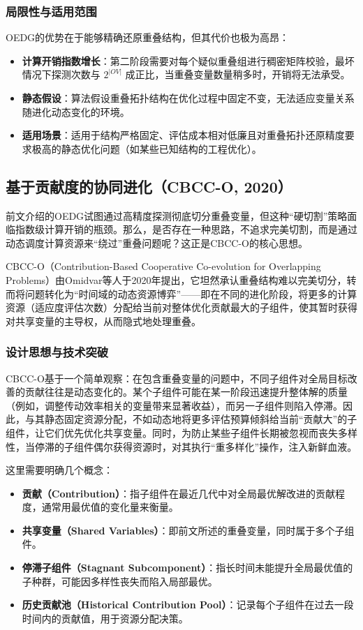 \subsubsection{局限性与适用范围}
OEDG的优势在于能够精确还原重叠结构，但其代价也极为高昂：
\begin{itemize}
    \item \textbf{计算开销指数增长}：第二阶段需要对每个疑似重叠组进行稠密矩阵校验，最坏情况下探测次数与 $2^{|OV|}$ 成正比，当重叠变量数量稍多时，开销将无法承受。
    \item \textbf{静态假设}：算法假设重叠拓扑结构在优化过程中固定不变，无法适应变量关系随进化动态变化的环境。
    \item \textbf{适用场景}：适用于结构严格固定、评估成本相对低廉且对重叠拓扑还原精度要求极高的静态优化问题（如某些已知结构的工程优化）。
\end{itemize}

\subsection{基于贡献度的协同进化（CBCC-O, 2020）}

前文介绍的OEDG试图通过高精度探测彻底切分重叠变量，但这种“硬切割”策略面临指数级计算开销的瓶颈。那么，是否存在一种思路，不追求完美切割，而是通过动态调度计算资源来“绕过”重叠问题呢？这正是CBCC-O的核心思想。

CBCC-O（Contribution-Based Cooperative Co-evolution for Overlapping Problems）由Omidvar等人于2020年提出，它坦然承认重叠结构难以完美切分，转而将问题转化为“时间域的动态资源博弈”——即在不同的进化阶段，将更多的计算资源（适应度评估次数）分配给当前对整体优化贡献最大的子组件，使其暂时获得对共享变量的主导权，从而隐式地处理重叠。

\subsubsection{设计思想与技术突破}
CBCC-O基于一个简单观察：在包含重叠变量的问题中，不同子组件对全局目标改善的贡献往往是动态变化的。某个子组件可能在某一阶段迅速提升整体解的质量（例如，调整传动效率相关的变量带来显著收益），而另一子组件则陷入停滞。因此，与其静态固定资源分配，不如动态地将更多评估预算倾斜给当前“贡献大”的子组件，让它们优先优化共享变量。同时，为防止某些子组件长期被忽视而丧失多样性，当停滞的子组件偶尔获得资源时，对其执行“重多样化”操作，注入新鲜血液。

这里需要明确几个概念：
\begin{itemize}
    \item \textbf{贡献（Contribution）}：指子组件在最近几代中对全局最优解改进的贡献程度，通常用最优值的变化量来衡量。
    \item \textbf{共享变量（Shared Variables）}：即前文所述的重叠变量，同时属于多个子组件。
    \item \textbf{停滞子组件（Stagnant Subcomponent）}：指长时间未能提升全局最优值的子种群，可能因多样性丧失而陷入局部最优。
    \item \textbf{历史贡献池（Historical Contribution Pool）}：记录每个子组件在过去一段时间内的贡献值，用于资源分配决策。
\end{itemize}

